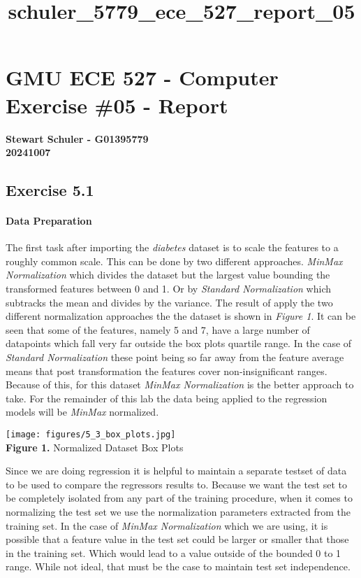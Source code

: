 \documentclass[11pt]{article}
\title{schuler\_5779\_ece\_527\_report\_05}
\begin{document}
    
    \maketitle
    
    

    
    \hypertarget{gmu-ece-527---computer-exercise-05---report}{%
\section{GMU ECE 527 - Computer Exercise \#05 -
Report}\label{gmu-ece-527---computer-exercise-05---report}}

\textbf{Stewart Schuler - G01395779}\\
\textbf{20241007}

    \hypertarget{exercise-5.1}{%
\subsection{Exercise 5.1}\label{exercise-5.1}}

\hypertarget{data-preparation}{%
\paragraph{Data Preparation}\label{data-preparation}}

The first task after importing the \emph{diabetes} dataset is to scale
the features to a roughly common scale. This can be done by two
different approaches. \emph{MinMax Normalization} which divides the
dataset but the largest value bounding the transformed features between
0 and 1. Or by \emph{Standard Normalization} which subtracks the mean
and divides by the variance. The result of apply the two different
normalization approaches the the dataset is shown in \emph{Figure 1}. It
can be seen that some of the features, namely 5 and 7, have a large
number of datapoints which fall very far outside the box plots quartile
range. In the case of \emph{Standard Normalization} these point being so
far away from the feature average means that post transformation the
features cover non-insignificant ranges. Because of this, for this
dataset \emph{MinMax Normalization} is the better approach to take. For
the remainder of this lab the data being applied to the regression
models will be \emph{MinMax} normalized.

\texttt{[image: figures/5\_3\_box\_plots.jpg]}\\
\textbf{Figure 1.} Normalized Dataset Box Plots

Since we are doing regression it is helpful to maintain a separate
testset of data to be used to compare the regressors results to. Because
we want the test set to be completely isolated from any part of the
training procedure, when it comes to normalizing the test set we use the
normalization parameters extracted from the training set. In the case of
\emph{MinMax Normalization} which we are using, it is possible that a
feature value in the test set could be larger or smaller that those in
the training set. Which would lead to a value outside of the bounded 0
to 1 range. While not ideal, that must be the case to maintain test set
independence.
\end{document}
